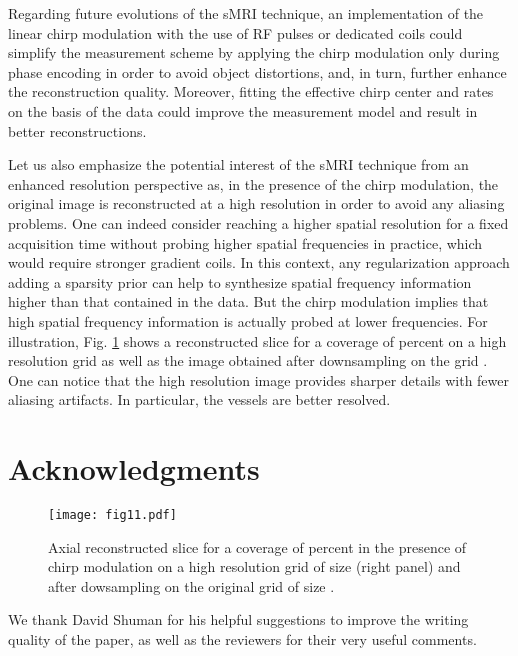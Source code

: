 \documentclass[10pt,draftcls, onecolumn]{IEEEtran}
\begin{document}
Regarding future evolutions of the sMRI technique, an implementation of the linear chirp modulation with the use of RF pulses or dedicated coils could simplify the measurement scheme by applying the chirp modulation only during phase encoding in order to avoid object distortions, and, in turn, further enhance the reconstruction quality. Moreover, fitting the effective chirp center and rates on the basis of the data could improve the measurement model and result in better reconstructions.

Let us also emphasize the potential interest of the sMRI technique from an enhanced resolution perspective as, in the presence of the chirp modulation, the original image is reconstructed at a high resolution in order to avoid any aliasing problems. One can indeed consider reaching a higher spatial resolution for a fixed acquisition time without probing higher spatial frequencies in practice, which would require stronger gradient coils. In this context, any regularization approach adding a sparsity prior can help to synthesize spatial frequency information higher than that contained in the data. But the chirp modulation implies that high spatial frequency information is actually probed at lower frequencies. For illustration, Fig. \ref{fig:high resolution} shows a reconstructed  slice for a coverage of  percent on a high resolution grid  as well as the image obtained after downsampling on the grid . One can notice that the high resolution image provides sharper details with fewer aliasing artifacts. In particular, the vessels are better resolved.

\section*{Acknowledgments}

\begin{figure}
\centering
\texttt{[image: fig11.pdf]}
\caption{\label{fig:high resolution} Axial  reconstructed slice for a coverage of  percent in the presence of chirp modulation on a high resolution grid of size  (right panel) and after dowsampling on the original grid of size .}
\vspace{-7mm}
\end{figure}


We thank David Shuman for his helpful suggestions to improve the writing quality of the paper, as well as the reviewers for their very useful comments.
\end{document}
